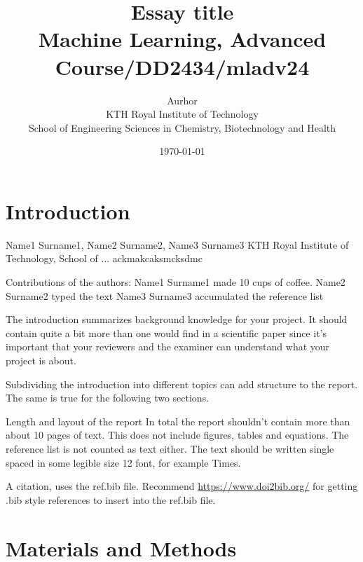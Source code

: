 \documentclass{article}
\title{Essay title\\\Large{Machine Learning, Advanced Course/DD2434/mladv24}}
\author{Aurhor \\ KTH Royal Institute of Technology\\ School of Engineering Sciences in Chemistry, Biotechnology and Health}
\date{\today}
\begin{document}
\maketitle
\thispagestyle{fancy}
\clearpage
\tableofcontents
\thispagestyle{fancy}

\clearpage
\fancyfoot[C]{\thepage}
\begin{multicols}{2}

\section*{Introduction}

Name1 Surname1, Name2 Surname2, Name3 Surname3 
KTH Royal Institute of Technology, School of ... 
ackmakcaksmcksdmc
 
Contributions of the authors: 
Name1 Surname1 made 10 cups of coffee. 
Name2 Surname2 typed the text 
Name3 Surname3 accumulated the reference list 



The introduction summarizes background knowledge for your project. It should contain quite 
a bit more than one would find in a scientific paper since it’s important that your reviewers 
and the examiner can understand what your project is about. 



Subdividing the introduction into different topics can add structure to the report. 
The same is true for the following two sections. 



Length and layout of the report 
In total the report shouldn't contain more than about 10 pages of text. This does not include 
figures, tables and equations. The reference list is not counted as text either. 
The text should be written single spaced in some legible size 12 font, for example Times. 



A citation, uses the ref.bib file.\cite{Beauchamp2015}
Recommend \href{https://www.doi2bib.org/}{https://www.doi2bib.org/} for getting .bib style references to insert into the ref.bib file.

\section*{Materials and Methods}


\end{multicols}
\end{document}
